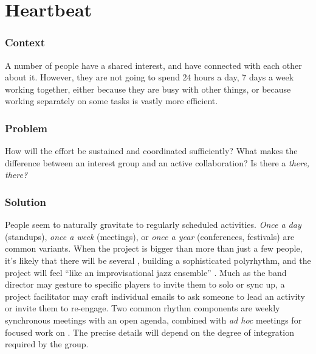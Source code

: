 \section{Heartbeat}\label{sec:Heartbeat}

\subsubsection*{Context}
A number of people have a shared interest, and have connected with each other about it.  However, they are not going to spend 24 hours a day, 7 days a week working together, either because they are busy with other things, or because working separately on some tasks is vastly more efficient.

\subsubsection*{Problem} How will the effort be sustained and coordinated sufficiently?  What makes the difference between an interest group and an active collaboration?  Is there a \emph{there, there?}

\subsubsection*{Solution} People seem to naturally gravitate to regularly scheduled activities.  \emph{Once a day} (standups), \emph{once a week} (meetings), or \emph{once a year} (conferences, festivals) are common variants.  When the project is bigger than more than just a few people, it's likely that there will be several , building a sophisticated polyrhythm, and the project will feel ``like an improvisational jazz ensemble'' \cite{david2001software}.  Much as the band director may gesture to specific players to invite them to solo or sync up, a project facilitator may craft individual emails to ask someone to lead an activity or invite them to re-engage.  Two common rhythm components are weekly synchronous meetings with an open agenda, combined with \emph{ad hoc} meetings for focused work on .  The precise details will depend on the degree of integration required by the group.

